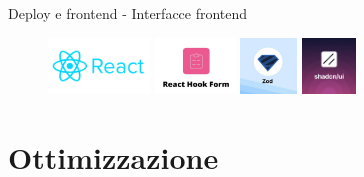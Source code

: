 \documentclass{beamer}
\begin{document}
\begin{frame}{Deploy e frontend - Interfacce frontend}
		\begin{figure}
			\centering
			\begin{minipage}{\textwidth}
				\centering
				\includegraphics[height=1.5cm]{react-logo.jpg}\hspace{0.5cm}
				\includegraphics[height=1.5cm]{react-hook-form-logo.jpg}\hspace{0.5cm}
				\includegraphics[height=1.5cm]{zod-logo.jpg}\hspace{0.5cm}
				\includegraphics[height=1.5cm]{shadcn-ui-logo.png}
			\end{minipage}
		\end{figure}
	\end{frame}


	\section{Ottimizzazione}
\end{document}
